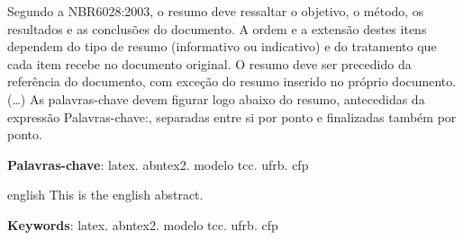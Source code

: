 

\frenchspacing

\imprimircapa


\setlength{\absparsep}{18pt} %
\begin{resumo}
 Segundo a NBR6028:2003, o resumo deve ressaltar o objetivo, o método, os 
 resultados e as conclusões do documento. 
 A ordem e a extensão destes itens dependem do tipo de resumo (informativo ou 
 indicativo) e do tratamento que cada item recebe no documento original. 
 O resumo deve ser precedido da referência do documento, com exceção do resumo 
 inserido no próprio documento. 
 (\ldots) As palavras-chave devem figurar logo abaixo do resumo, antecedidas da 
 expressão Palavras-chave:, separadas entre si por ponto e finalizadas também 
 por ponto.

 \textbf{Palavras-chave}: latex. abntex2. modelo tcc. ufrb. cfp
\end{resumo}

\begin{resumo}[Abstract]
 \begin{otherlanguage*}{english}
   This is the english abstract.

   \vspace{\onelineskip}
 
   \noindent 
   \textbf{Keywords}: latex. abntex2. modelo tcc. ufrb. cfp
 \end{otherlanguage*}
\end{resumo}


\tableofcontents*
\cleardoublepage
